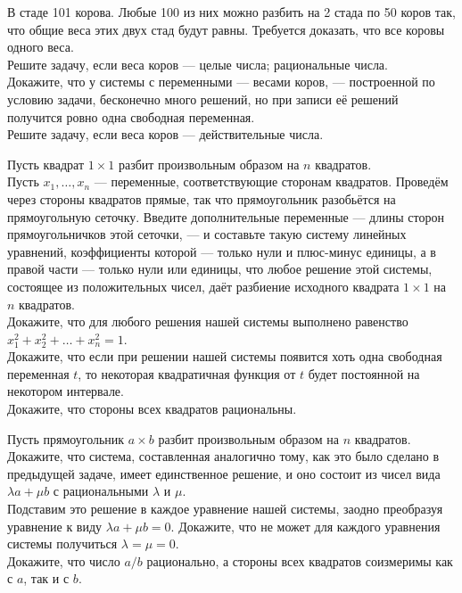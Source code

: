 \documentclass[a4paper,12pt]{article}
\begin{document}

 В стаде 101 корова. Любые 100 из них можно разбить на 2
стада по 50 коров так, что общие веса этих двух стад будут равны. Требуется доказать,
что все коровы одного веса. \\
 Решите задачу, если веса коров --- целые числа; рациональные числа.\\
 Докажите, что у системы с переменными --- весами коров, --- построенной по условию задачи, бесконечно много решений,
но при записи её решений получится ровно одна свободная переменная.\\
 Решите задачу, если веса коров --- действительные числа.

 Пусть квадрат $1\times 1$ разбит произвольным образом на $n$ квадратов.\\ %
Пусть $x_1,\dots,x_n$ --- переменные, соответствующие сторонам квадратов. Проведём через стороны квадратов прямые, так что прямоугольник
разобьётся на прямоугольную сеточку. Введите дополнительные переменные --- длины сторон прямоугольничков этой сеточки, --- и составьте
такую систему линейных уравнений, коэффициенты которой --- только нули и плюс-минус единицы, а в правой части ---  только нули или единицы, что любое решение этой системы, состоящее из положительных чисел, даёт разбиение исходного квадрата $1\times1$ на $n$ квадратов.\\
\sloppy Докажите, что для любого решения нашей системы выполнено равенство
\mbox{$x_1^2+x_2^2+\ldots+x_n^2 = 1$}.\\
 Докажите, что если при решении нашей системы появится хоть одна свободная переменная $t$, то некоторая квадратичная функция от $t$ будет постоянной на некотором интервале.\\
 Докажите, что стороны всех квадратов рациональны.


 Пусть прямоугольник $a\times b$ разбит произвольным образом
на $n$ квадратов. \\
Докажите, что система, составленная аналогично тому, как это было сделано в предыдущей задаче, имеет единственное решение, и оно состоит из чисел вида $\lambda a+\mu b$ с рациональными $\lambda$ и $\mu$.\\
 Подставим это решение в каждое уравнение нашей системы, заодно преобразуя уравнение к виду $\lambda a+\mu b=0$. Докажите, что не может для каждого уравнения системы получиться $\lambda=\mu=0$.\\
 Докажите, что число $a/b$ рационально, а стороны всех квадратов соизмеримы как с $a$, так и с $b$.
\end{document}
